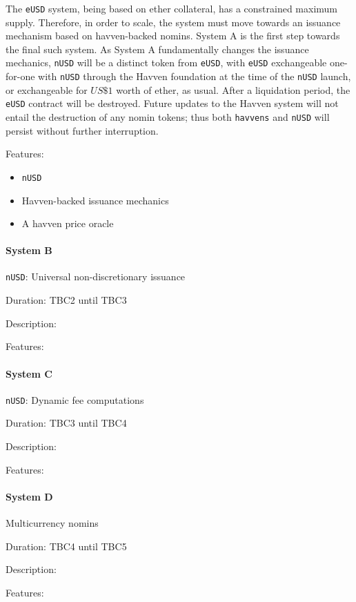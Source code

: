 The \texttt{eUSD} system, being based on ether collateral, has a constrained maximum supply.
Therefore, in order to scale, the system must move towards an issuance mechanism based on havven-backed
nomins. System A is the first step towards the final such system. As System A fundamentally
changes the issuance mechanics, \texttt{nUSD} will be a distinct token from \texttt{eUSD},
with \texttt{eUSD} exchangeable one-for-one with \texttt{nUSD} through the Havven
foundation at the time of the \texttt{nUSD} launch, or exchangeable for \(US\$1\) worth of ether,
as usual. After a liquidation period, the \texttt{eUSD} contract will be destroyed.
Future updates to the Havven system will not entail the destruction of any nomin tokens; thus
both \texttt{havvens} and \texttt{nUSD} will persist without further interruption.

Features:
\begin{itemize}
    \item{\texttt{nUSD}}
    \item{Havven-backed issuance mechanics}
    \item{A havven price oracle}
\end{itemize}


\paragraph{System B} \texttt{nUSD}: Universal non-discretionary issuance

Duration: TBC2 until TBC3

Description:

Features:


\paragraph{System C} \texttt{nUSD}: Dynamic fee computations

Duration: TBC3 until TBC4

Description:

Features:


\paragraph{System D} Multicurrency nomins

Duration: TBC4 until TBC5

Description:

Features:

